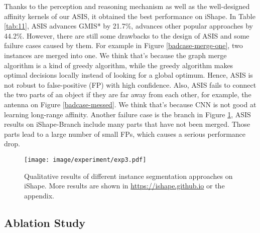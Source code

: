 Thanks to the perception and reasoning mechanism as well as the well-designed affinity kernels of our ASIS, it obtained the best performance on iShape. In Table \ref{tab:11}, ASIS advances GMIS* \cite{liu2018affinity} by 21.7\%, advances other popular approaches by 44.2\%. However, there are still some drawbacks to the design of ASIS and some failure cases caused by them. For example in Figure \ref{badcase-merge-one}, two instances are merged into one. We think that's because the graph merge algorithm is a kind of greedy algorithm, while the greedy algorithm makes optimal decisions locally instead of looking for a global optimum. Hence, ASIS is not robust to false-positive (FP) with high confidence. Also, ASIS fails to connect the two parts of an object if they are far away from each other, for example, the antenna on Figure \ref{badcase-messed}. We think that's because CNN is not good at learning long-range affinity. Another failure case is the branch in Figure \ref{fig:result}, ASIS results on iShape-Branch include many parts that have not been merged. Those parts lead to a large number of small FPs, which causes a serious performance drop.

\begin{figure}[h]
    \centering
    \texttt{[image: image/experiment/exp3.pdf]}
    \caption{Qualitative results of different instance segmentation approaches on iShape. More results are shown in \url{https://ishape.github.io} or the appendix.}
    \label{fig:result}
    \vspace{-1em}
\end{figure}

\subsection{Ablation Study}


